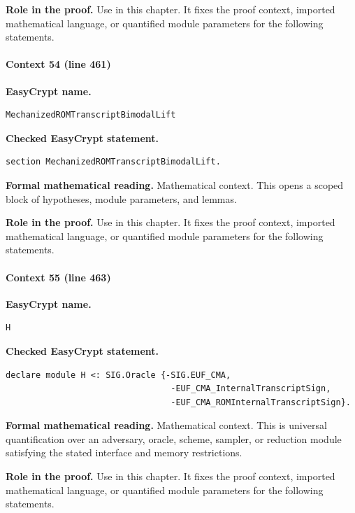 \noindent\textbf{Role in the proof.}
Use in this chapter. It fixes the proof context, imported mathematical language, or quantified module parameters for the following statements.

\paragraph{Context 54 (line 461)}
\noindent\textbf{EasyCrypt name.}
\begin{lstlisting}[language=EasyCrypt,basicstyle=\ttfamily\scriptsize]
MechanizedROMTranscriptBimodalLift
\end{lstlisting}
\noindent\textbf{Checked EasyCrypt statement.}
\begin{lstlisting}[language=EasyCrypt,basicstyle=\ttfamily\scriptsize]
section MechanizedROMTranscriptBimodalLift.
\end{lstlisting}
\noindent\textbf{Formal mathematical reading.}
Mathematical context. This opens a scoped block of hypotheses, module parameters, and lemmas.

\noindent\textbf{Role in the proof.}
Use in this chapter. It fixes the proof context, imported mathematical language, or quantified module parameters for the following statements.

\paragraph{Context 55 (line 463)}
\noindent\textbf{EasyCrypt name.}
\begin{lstlisting}[language=EasyCrypt,basicstyle=\ttfamily\scriptsize]
H
\end{lstlisting}
\noindent\textbf{Checked EasyCrypt statement.}
\begin{lstlisting}[language=EasyCrypt,basicstyle=\ttfamily\scriptsize]
declare module H <: SIG.Oracle {-SIG.EUF_CMA,
                                 -EUF_CMA_InternalTranscriptSign,
                                 -EUF_CMA_ROMInternalTranscriptSign}.
\end{lstlisting}
\noindent\textbf{Formal mathematical reading.}
Mathematical context. This is universal quantification over an adversary, oracle, scheme, sampler, or reduction module satisfying the stated interface and memory restrictions.

\noindent\textbf{Role in the proof.}
Use in this chapter. It fixes the proof context, imported mathematical language, or quantified module parameters for the following statements.

